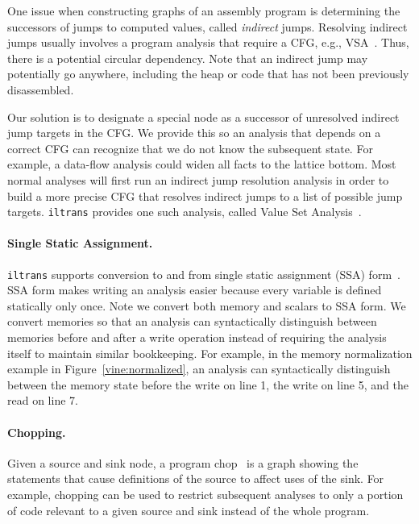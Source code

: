 One issue when constructing  graphs of an assembly program is
determining the successors of jumps to computed values, called {\it
  indirect} jumps.  Resolving indirect jumps usually involves a program
analysis that require a CFG, e.g., VSA~\cite{balakrishnan:2007}. Thus,
there is a potential circular dependency.  Note that an indirect jump
may potentially go anywhere, including the heap or code that has not
been previously disassembled.

Our solution is to designate a special node as a successor of
unresolved indirect jump targets in the CFG.  We provide this so an
analysis that depends on a correct CFG can recognize that we do not
know the subsequent state. For example, a data-flow analysis could
widen all facts to the lattice bottom.  Most normal analyses will
first run an indirect jump resolution analysis in order to build a
more precise CFG that resolves indirect jumps to a list of possible
jump targets.  {\tt iltrans} provides one such analysis, called Value Set
Analysis~\cite{balakrishnan:2007}.

\paragraph{Single Static Assignment.} {\tt iltrans} supports
conversion to and from single static assignment (SSA)
form~\cite{muchnick:1997}. SSA form makes writing an analysis easier
because every variable is defined statically only once.  Note we
convert both memory and scalars to SSA form. We convert memories so
that an analysis can syntactically distinguish between memories before
and after a write operation instead of requiring the analysis itself
to maintain similar bookkeeping. For example, in the memory
normalization example in Figure~\ref{vine:normalized}, an analysis can
syntactically distinguish between the memory state before the write on
line 1, the write on line 5, and the read on line 7.

\paragraph{Chopping.}  Given a source and sink node, a program
chop~\cite{jackson:1994} is a graph showing the statements that cause
definitions of the source to affect uses of the sink.  For example,
chopping can be used to restrict subsequent analyses to only a portion
of code relevant to a given source and sink instead of the whole
program. %

